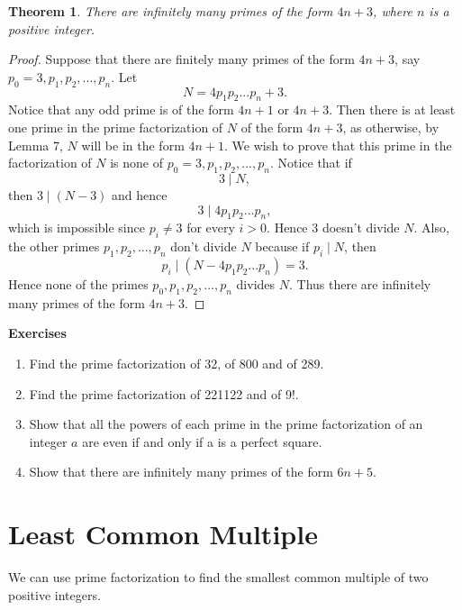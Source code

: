 \documentclass[12pt,letterpaper]{book}
\newtheorem{theorem}{Theorem}
\begin{document}
\begin{theorem}
There are infinitely many primes of the form $4n+3$, where $n$ is a
positive integer.
\end{theorem}

\begin{proof}
Suppose that there are finitely many primes of the form $4n+3$, say\\
$p_0=3,p_1,p_2,...,p_n$.  Let
\begin{equation*}
N=4p_1p_2...p_n+3.
\end{equation*}
Notice that any odd prime is of the form $4n+1$ or $4n+3$.  Then
there is at least one prime in the prime factorization of $N$ of the
form $4n+3$, as otherwise, by Lemma 7, $N$ will be in the form $4n+1$.
We wish to prove that this prime in the factorization of $N$ is none
of $p_0=3,p_1,p_2,...,p_n$. Notice that if
\begin{equation*}
3\mid N,
\end{equation*}
then $3 \mid (N-3)$ and hence
\begin{equation*}
3 \mid 4p_1p_2...p_n,
\end{equation*}
which is impossible since $p_i\neq 3$ for every $i>0$. Hence 3 doesn't divide $N$. Also, the other
primes $p_1,p_2,...,p_n$ don't divide $N$ because if $p_i \mid N$,
then
\begin{equation*}
p_i\mid (N-4p_1p_2...p_n)=3.
\end{equation*}
Hence none of the primes $p_0,p_1,p_2,...,p_n$ divides $N$. Thus
there are infinitely many primes of the form $4n+3$.
\end{proof}


 \textbf{Exercises}
\begin{enumerate}
\item{Find the prime factorization of 32, of 800 and of
289.}\item{Find the prime factorization of 221122 and of
9!.}\item{Show that all the powers of each prime in the prime factorization of
an integer $a$ are even if and only if a is a perfect
square.}\item{Show that there are infinitely many primes of the form
$6n+5$.}
\end{enumerate}

\newpage

\section{Least Common Multiple}
We can use prime factorization to find the smallest common multiple
of two positive integers.
\end{document}
